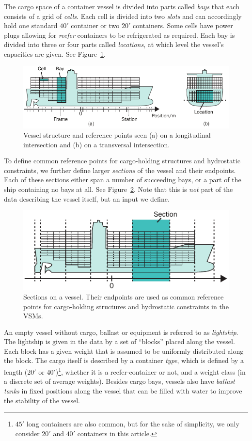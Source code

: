 The cargo space of a container vessel is divided into parts called \textit{bays} that each consists of a grid of \emph{cells}. Each cell is divided into two \emph{slots} and can accordingly hold one standard $40'$ container or two $20'$ containers. Some cells have power plugs allowing for \emph{reefer} containers to be refrigerated as required. Each bay is divided into three or four parts called \textit{locations}, at which level the vessel's capacities are given. See Figure~\ref{fig:vessel}.
\begin{figure}[htbp]
	\centering
		\includegraphics{figures/vessel3.pdf}
	\caption{Vessel structure and reference points seen (a) on a longitudinal intersection and (b) on a transversal intersection.}
	\label{fig:vessel}
\end{figure}
To define common reference points for cargo-holding structures and hydrostatic constraints, we further define larger \emph{sections} of the vessel and their endpoints. Each of these sections either span a number of succeeding bays, or a part of the ship containing no bays at all.
See Figure~\ref{fig:sectionEndPoints}. Note that this is \emph{not} part of the data describing the vessel itself, but an input we define.

\begin{figure}[htbp]
	\centering
		\includegraphics{figures/sectionEndPoints.pdf}
	\caption{Sections on a vessel. Their endpoints are used as common reference points for cargo-holding structures and hydrostatic constraints in the VSMs.}
	\label{fig:sectionEndPoints}
\end{figure}

An empty vessel without cargo, ballast or equipment is referred to as \emph{lightship}.  The lightship is given in the data by a set of ``blocks'' placed along the vessel. Each block has a given weight that is assumed to be uniformly distributed along the block.
The cargo itself is described by a container \emph{type}, which is defined by a length ($20'$ or $40'$)\footnote{$45'$ long containers are also common, but for the sake of simplicity, we only consider $20'$ and $40'$ containers in this article.}, whether it is a reefer-container or not, and a weight class (in a discrete set of average weights). 
Besides cargo bays, vessels also have \emph{ballast tanks} in fixed positions along the vessel that can be filled with water to improve the stability of the vessel.

